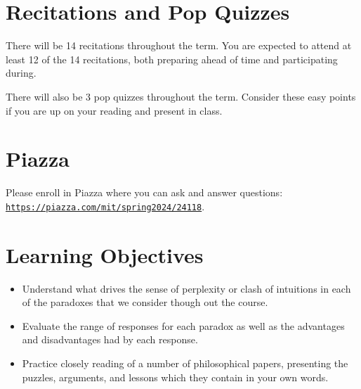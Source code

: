 \documentclass[letterpaper]{infinity_syllabus} %
\begin{document}
\vspace{0.5cm}
\section{Recitations and Pop Quizzes}

There will be 14 recitations throughout the term.
You are expected to attend at least 12 of the 14 recitations, both preparing ahead of time and participating during.

There will also be 3 pop quizzes throughout the term.
Consider these easy points if you are up on your reading and present in class.


\vspace{0.5cm}
\section{Piazza}

Please enroll in Piazza where you can ask and answer questions:\\
\href{https://piazza.com/mit/spring2024/24118}{\texttt{https://piazza.com/mit/spring2024/24118}}.



\newpage %

\makeSide %


\vspace{0.5cm}
\section{Learning Objectives}

\begin{itemize}
  \item Understand what drives the sense of perplexity or clash of intuitions in each of the paradoxes that we consider though out the course.
  \item Evaluate the range of responses for each paradox as well as the advantages and disadvantages had by each response.
  \item Practice closely reading of a number of philosophical papers, presenting the puzzles, arguments, and lessons which they contain in your own words.
\end{itemize}
\end{document}
